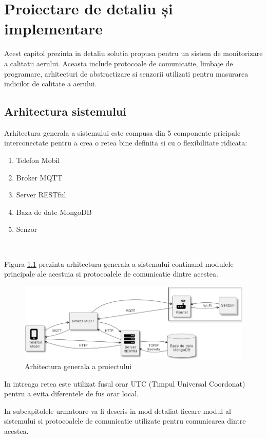 \chapter{Proiectare de detaliu și implementare}
\pagestyle{fancy}

Acest capitol prezinta in detaliu solutia propusa pentru un sistem de monitorizare a calitatii aerului. Aceasta include protocoale de 
comunicatie, limbaje de programare, arhitecturi de abstractizare si senzorii utilizati pentru masurarea indicilor de calitate a aerului.

\section{Arhitectura sistemului}\label{sec:pi_general_architecture}
Arhitectura generala a sistemului este compusa din 5 componente pricipale interconectate pentru a crea o retea bine definita si cu o flexibilitate
ridicata:
\begin{enumerate}
	\item Telefon Mobil
	\item Broker MQTT
	\item Server RESTful
	\item Baza de date MongoDB
	\item Senzor
\end{enumerate}

\

Figura \ref{fig:ArhitecturaGenerala} prezinta arhitectura generala a sistemului continand modulele principale ale acestuia si protocoalele de comunicatie 
dintre acestea.
\begin{figure}[H]
    \centering
    \includegraphics[scale=0.68]{figs/ArhitecturaGenerala.png}
    \caption{Arhitectura generala a proiectului}
    \label{fig:ArhitecturaGenerala}
\end{figure}

In intreaga retea este utilizat fusul orar UTC (Timpul Universal Coordonat) pentru a evita diferentele de fus orar local.

In subcapitolele urmatoare va fi descris in mod detaliat fiecare modul al sistemului si protocoalele de comunicatie utilizate pentru comunicarea dintre 
acestea.

